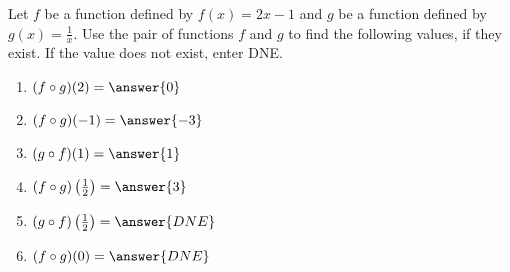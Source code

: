 \documentclass{ximera}
\author{Kenneth Berglund}
\begin{document}
\licenseSZ
\begin{exercise}
Let $f$ be a function defined by $f(x) = 2x -1$ and $g$ be a function defined by $g(x) =\frac{1}{x}$. Use the pair of functions $f$ and $g$ to find the following values, if they exist. If the value does not exist, enter DNE.
\begin{enumerate}
\item $(f \circ g)(2) = \answer{0}$
\item $(f \circ g)(-1) = \answer{-3}$
\item $(g \circ f)(1) = \answer{1}$
\item $(f \circ g)\left(\frac{1}{2}\right) = \answer{3}$
\item $(g\circ f)\left(\frac{1}{2}\right) = \answer{DNE}$
\item $(f \circ g)(0) = \answer{DNE}$
\end{enumerate}

\end{exercise}
\end{document}
